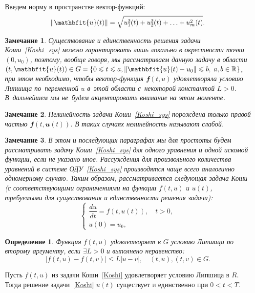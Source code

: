 \documentclass[11pt,a4paper,twoside]{report}
\numberwithin{equation}{section}
\newtheorem*{definition}{Определение}
\theoremstyle{definition}
\theoremstyle{plain}
\newtheorem{note}{Замечание}[section]
\DeclarePairedDelimiter\norm{\lVert}{\rVert}
\newcommand{\vfunc}[1]{\mathbfit{#1}}
\begin{document}
Введем норму в пространстве вектор-функций:
%
$$
    \norm{\vfunc{u}(t)} = \sqrt{u_1^2(t) + u_2^2(t) + \ldots + u_m^2(t)}.
$$
%
\begin{note}
%
    Существование и единственность решения задачи Коши~\eqref{Koshi_sys} можно
    гарантировать лишь локально в окрестности точки $(0, u_0)$, поэтому, вообще
    говоря, мы рассматриваем данную задачу в области
    $(t, \vfunc{u}(t)) \in G=\{0 \leqslant t \leqslant a,
    \norm{\vfunc{u}(t)-u_0}\leqslant b,\;
    a, b\in\mathbb{R}\}$, при этом необходимо, чтобы вектор-функция
    $\vfunc{f}(t, u)$
    удовлетворяла условию Липшица по~переменной $u$ в~этой области
    с~некоторой константой $L>0$.
    В~дальнейшем мы не~будем акцентировать внимание на этом моменте.
%
\end{note}
%
\begin{note}
%
    Нелинейность задачи Коши~\eqref{Koshi_sys} порождена только правой частью
    $\vfunc{f}(t, \vfunc{u}(t))$. В таких случаях нелинейность называют слабой.
%
\end{note}
%
\begin{note}
%
    В этом и последующих параграфах мы для простоты будем рассматривать задачу
    Коши~\eqref{Koshi_sys} для одного уравнения и одной искомой функции, если
    не указано иное. Рассуждения для произвольного количества уравнений
    в системе ОДУ~\eqref{Koshi_sys} производятся чаще всего аналогично одномерному случаю.
    Таким образом, рассматривается следующая задача Коши (с соответствующими
    ограничениями на функции $f(t, u)$ и $u(t)$, требуемыми для существования
    и единственности решения задачи):
    \begin{equation}
%
    \label{Koshi}
    \begin{cases}
        \dfrac{du}{dt} = f(t, u(t)), \quad t > 0, \\
        u(0) = u_0,
    \end{cases}
\end{equation}
%
%
\end{note}
%
%
\begin{definition}
%
    Функция $f(t,u)$ удовлетворяет в $G$ условию Липшица по второму аргументу,
    если $\exists L > 0$ и выполнено неравенство:
    $$
        |f(t,u) - f(t,v)| \leqslant L|u-v|, \quad (t, u), (t, v)\in G.
    $$
%
\end{definition}
%
Пусть $f(t,u)$ из задачи Коши~\eqref{Koshi} удовлетворяет условию Липшица
в $R$. Тогда решение задачи~\eqref{Koshi} $u(t)$ существует и единственно при
$0 < t < T$.
\fi %
\end{document}
